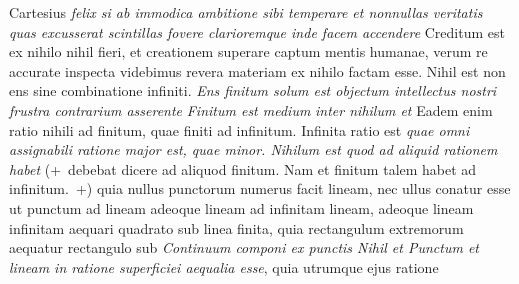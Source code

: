 \pend%
\pstart%
Cartesius\protect{}
\textit{felix si ab immodica ambitione sibi temperare et nonnullas veritatis quas excusserat scintillas fovere clarioremque inde facem accendere
}
\pend 
\count{}
\count{}
\pstart 
Creditum est ex nihilo nihil fieri,
et creationem superare captum mentis humanae,
verum re accurate inspecta videbimus revera materiam ex nihilo factam esse.
Nihil est non ens sine combinatione infiniti.
\textit{Ens finitum solum est objectum intellectus\protect{} nostri
frustra contrarium asserente
}
\textit{Finitum est medium}
\textit{inter nihilum et }
Eadem enim ratio nihili ad finitum, quae finiti ad infinitum.\protect{}
Infinita ratio est
\textit{quae omni assignabili ratione major est,  quae minor.
Nihilum\protect{} est quod ad aliquid rationem habet
}
(+~debebat dicere ad aliquod finitum. Nam et finitum talem habet ad infinitum.~+)
quia nullus punctorum numerus facit lineam,
nec ullus
conatur esse ut punctum ad lineam
adeoque lineam ad infinitam lineam,
adeoque lineam infinitam aequari quadrato sub linea finita,
quia rectangulum extremorum aequatur rectangulo sub
\textit{Continuum\protect{}
componi ex punctis
Nihil et %
Punctum et lineam in ratione superficiei aequalia esse},
quia utrumque ejus ratione 
